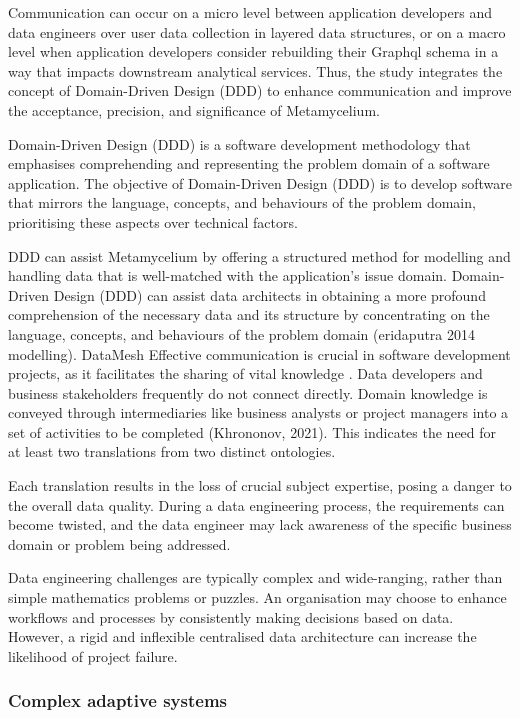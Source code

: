 \documentclass[preprint,12pt]{elsarticle}
\begin{document}
Communication can occur on a micro level between application developers and data engineers over user data collection in layered data structures, or on a macro level when application developers consider rebuilding their Graphql schema in a way that impacts downstream analytical services. Thus, the study integrates the concept of Domain-Driven Design (DDD) to enhance communication and improve the acceptance, precision, and significance of Metamycelium.

Domain-Driven Design (DDD) is a software development methodology that emphasises comprehending and representing the problem domain of a software application. The objective of Domain-Driven Design (DDD) is to develop software that mirrors the language, concepts, and behaviours of the problem domain, prioritising these aspects over technical factors. 

DDD can assist Metamycelium by offering a structured method for modelling and handling data that is well-matched with the application's issue domain. Domain-Driven Design (DDD) can assist data architects in obtaining a more profound comprehension of the necessary data and its structure by concentrating on the language, concepts, and behaviours of the problem domain (eridaputra 2014 modelling). DataMesh Effective communication is crucial in software development projects, as it facilitates the sharing of vital knowledge \cite{sudhakar2012model}. Data developers and business stakeholders frequently do not connect directly. Domain knowledge is conveyed through intermediaries like business analysts or project managers into a set of activities to be completed (Khrononov, 2021). This indicates the need for at least two translations from two distinct ontologies.

Each translation results in the loss of crucial subject expertise, posing a danger to the overall data quality. During a data engineering process, the requirements can become twisted, and the data engineer may lack awareness of the specific business domain or problem being addressed.

Data engineering challenges are typically complex and wide-ranging, rather than simple mathematics problems or puzzles. An organisation may choose to enhance workflows and processes by consistently making decisions based on data. However, a rigid and inflexible centralised data architecture can increase the likelihood of project failure.


\subsubsection{Complex adaptive systems}
\end{document}
